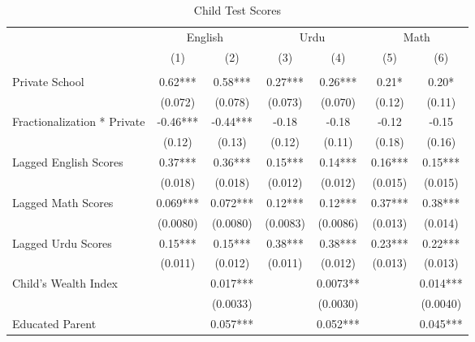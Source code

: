 \begin{sidewaystable}[htbp]\centering
\def\sym#1{\ifmmode^{#1}\else\(^{#1}\)\fi}
\caption{Child Test Scores\label{kids}}
\begin{tabular}{l*{6}{c}}
\toprule
                &\multicolumn{2}{c}{English}&\multicolumn{2}{c}{Urdu} &\multicolumn{2}{c}{Math} \\\cmidrule(lr){2-3}\cmidrule(lr){4-5}\cmidrule(lr){6-7}
                &\multicolumn{1}{c}{(1)}&\multicolumn{1}{c}{(2)}&\multicolumn{1}{c}{(3)}&\multicolumn{1}{c}{(4)}&\multicolumn{1}{c}{(5)}&\multicolumn{1}{c}{(6)}\\
                &\multicolumn{1}{c}{}&\multicolumn{1}{c}{}&\multicolumn{1}{c}{}&\multicolumn{1}{c}{}&\multicolumn{1}{c}{}&\multicolumn{1}{c}{}\\
\midrule
Private School  &     0.62***&     0.58***&     0.27***&     0.26***&     0.21*  &     0.20*  \\
                &  (0.072)   &  (0.078)   &  (0.073)   &  (0.070)   &   (0.12)   &   (0.11)   \\
Fractionalization * Private&    -0.46***&    -0.44***&    -0.18   &    -0.18   &    -0.12   &    -0.15   \\
                &   (0.12)   &   (0.13)   &   (0.12)   &   (0.11)   &   (0.18)   &   (0.16)   \\
Lagged English Scores&     0.37***&     0.36***&     0.15***&     0.14***&     0.16***&     0.15***\\
                &  (0.018)   &  (0.018)   &  (0.012)   &  (0.012)   &  (0.015)   &  (0.015)   \\
Lagged Math Scores&    0.069***&    0.072***&     0.12***&     0.12***&     0.37***&     0.38***\\
                & (0.0080)   & (0.0080)   & (0.0083)   & (0.0086)   &  (0.013)   &  (0.014)   \\
Lagged Urdu Scores&     0.15***&     0.15***&     0.38***&     0.38***&     0.23***&     0.22***\\
                &  (0.011)   &  (0.012)   &  (0.011)   &  (0.012)   &  (0.013)   &  (0.013)   \\
Child's Wealth Index&            &    0.017***&            &   0.0073** &            &    0.014***\\
                &            & (0.0033)   &            & (0.0030)   &            & (0.0040)   \\
Educated Parent &            &    0.057***&            &    0.052***&            &    0.045***\\

\end{tabular}
\end{sidewaystable}

